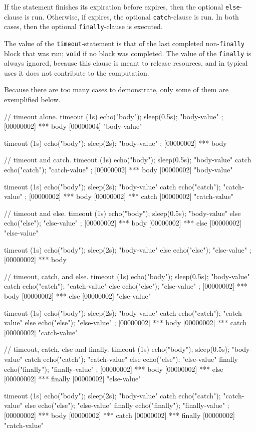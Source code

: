 
If the statement finishes its expiration before  expires, then
the optional \lstinline|else|-clause is run.  Otherwise, if 
expires, the optional \lstinline|catch|-clause is run.  In both cases, then
the optional \lstinline|finally|-clause is executed.

The value of the \lstinline|timeout|-statement is that of the last
completed non-\lstinline|finally| block that was run; \lstinline|void| if
no block was completed.  The value of the \lstinline|finally| is always
ignored, because this clause is meant to release resources, and in typical
uses it does not contribute to the computation.

Because there are too many cases to demonstrate, only some of them are
exemplified below.
\begin{urbiscript}
// timeout alone.
timeout (1s)  { echo("body"); sleep(0.5s); "body-value" };
[00000002] *** body
[00000004] "body-value"

timeout (1s)  { echo("body"); sleep(2s); "body-value" };
[00000002] *** body

// timeout and catch.
timeout (1s)  { echo("body"); sleep(0.5s); "body-value" }
catch         { echo("catch"); "catch-value" };
[00000002] *** body
[00000002] "body-value"

timeout (1s)  { echo("body"); sleep(2s); "body-value" }
catch         { echo("catch"); "catch-value" };
[00000002] *** body
[00000002] *** catch
[00000002] "catch-value"

// timeout and else.
timeout (1s)  { echo("body"); sleep(0.5s); "body-value" }
else          { echo("else"); "else-value" };
[00000002] *** body
[00000002] *** else
[00000002] "else-value"

timeout (1s)  { echo("body"); sleep(2s); "body-value" }
else          { echo("else"); "else-value" };
[00000002] *** body

// timeout, catch, and else.
timeout (1s)  { echo("body"); sleep(0.5s); "body-value" }
catch         { echo("catch"); "catch-value" }
else          { echo("else"); "else-value" };
[00000002] *** body
[00000002] *** else
[00000002] "else-value"

timeout (1s)  { echo("body"); sleep(2s); "body-value" }
catch         { echo("catch"); "catch-value" }
else          { echo("else"); "else-value" };
[00000002] *** body
[00000002] *** catch
[00000002] "catch-value"

// timeout, catch, else and finally.
timeout (1s)  { echo("body"); sleep(0.5s); "body-value" }
catch         { echo("catch"); "catch-value" }
else          { echo("else"); "else-value" }
finally       { echo("finally"); "finally-value" };
[00000002] *** body
[00000002] *** else
[00000002] *** finally
[00000002] "else-value"

timeout (1s)  { echo("body"); sleep(2s); "body-value" }
catch         { echo("catch"); "catch-value" }
else          { echo("else"); "else-value" }
finally       { echo("finally"); "finally-value" };
[00000002] *** body
[00000002] *** catch
[00000002] *** finally
[00000002] "catch-value"
\end{urbiscript}

